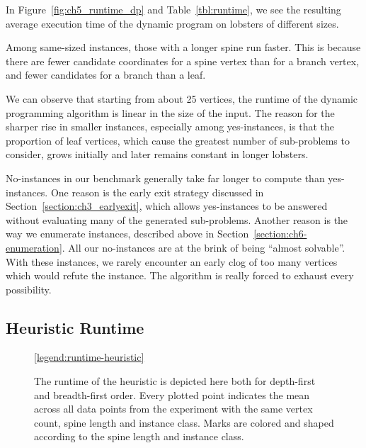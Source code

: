 In Figure~\ref{fig:ch5_runtime_dp} and Table~\ref{tbl:runtime}, we see the resulting average execution time of the dynamic program on lobsters of different sizes.

Among same-sized instances, those with a longer spine run faster. This is because there are fewer candidate coordinates for a spine vertex than for a branch vertex, and fewer candidates for a branch than a leaf.

We can observe that starting from about 25 vertices, the runtime of the dynamic programming algorithm is linear in the size of the input. The reason for the sharper rise in smaller instances, especially among yes-instances, is that the proportion of leaf vertices, which cause the greatest number of sub-problems to consider, grows initially and later remains constant in longer lobsters.

No-instances in our benchmark generally take far longer to compute than yes-instances. One reason is the early exit strategy discussed in Section~\ref{section:ch3_earlyexit}, which allows yes-instances to be answered without evaluating many of the generated sub-problems. Another reason is the way we enumerate instances, described above in Section~\ref{section:ch6-enumeration}. All our no-instances are at the brink of being ``almost solvable''. With these instances, we rarely encounter an early clog of too many vertices which would refute the instance. The algorithm is really forced to exhaust every possibility.

\subsection{Heuristic Runtime}

\begin{figure}[t]
    \centering %
    \scalebox{1}{}
    \scalebox{1}{}
    \ref{legend:runtime-heuristic}
    \caption{The runtime of the heuristic is depicted here both for depth-first and breadth-first order. Every plotted point indicates the mean across all data points from the experiment with the same vertex count, spine length and instance class. Marks are colored and shaped according to the spine length and instance class.}
    \label{fig:ch5_runtime_heuristic}
\end{figure}


